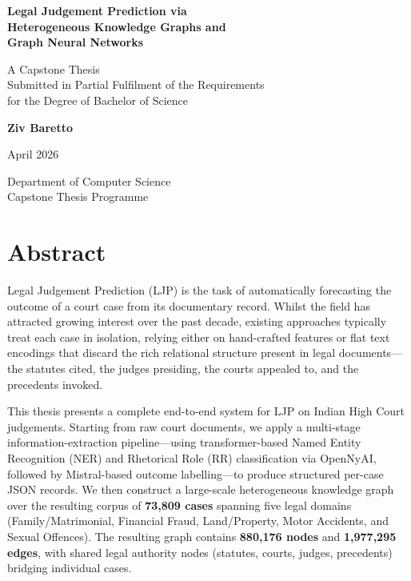 \documentclass[12pt,a4paper]{report}
\begin{document}
\begin{titlepage}
  \centering
  \vspace*{2cm}
  {\huge\bfseries Legal Judgement Prediction via\\[0.4em]
  Heterogeneous Knowledge Graphs and\\[0.4em]
  Graph Neural Networks\par}
  \vspace{1.5cm}
  {\Large A Capstone Thesis\\[0.5em]
  Submitted in Partial Fulfilment of the Requirements\\[0.3em]
  for the Degree of Bachelor of Science\par}
  \vspace{1.5cm}
  {\large\bfseries Ziv Baretto\par}
  \vspace{0.5cm}
  {\large April 2026\par}
  \vfill
  {\normalsize Department of Computer Science\\
  Capstone Thesis Programme\par}
\end{titlepage}

\chapter*{Abstract}

Legal Judgement Prediction (LJP) is the task of automatically forecasting the outcome of a court case from its documentary record. Whilst the field has attracted growing interest over the past decade, existing approaches typically treat each case in isolation, relying either on hand-crafted features or flat text encodings that discard the rich relational structure present in legal documents---the statutes cited, the judges presiding, the courts appealed to, and the precedents invoked.

This thesis presents a complete end-to-end system for LJP on Indian High Court judgements. Starting from raw court documents, we apply a multi-stage information-extraction pipeline---using transformer-based Named Entity Recognition (NER) and Rhetorical Role (RR) classification via OpenNyAI, followed by Mistral-based outcome labelling---to produce structured per-case JSON records. We then construct a large-scale heterogeneous knowledge graph over the resulting corpus of \textbf{73,809 cases} spanning five legal domains (Family/Matrimonial, Financial Fraud, Land/Property, Motor Accidents, and Sexual Offences). The resulting graph contains \textbf{880,176 nodes} and \textbf{1,977,295 edges}, with shared legal authority nodes (statutes, courts, judges, precedents) bridging individual cases.
\end{document}
